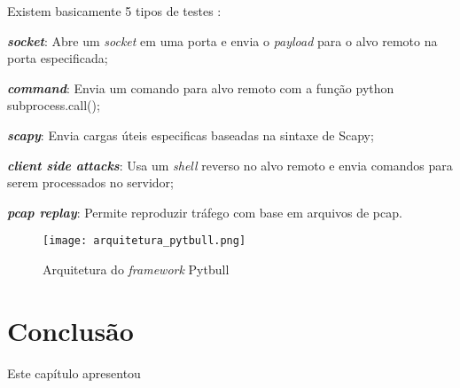 Existem basicamente 5 tipos de testes \cite{pytbull}: 
\begin{alineas}
\item \textbf{\textit{socket}}: Abre um \textit{socket} em uma porta e envia o \textit{payload} para o alvo remoto na porta especificada; 
\item \textbf{\textit{command}}: Envia um comando para alvo remoto com a função python subprocess.call(); 
\item \textbf{\textit{scapy}}: Envia cargas úteis especificas baseadas na sintaxe de Scapy;
\item \textbf{\textit{client side attacks}}: Usa um \textit{shell} reverso no alvo remoto e envia comandos para serem processados no servidor; 
\item \textbf{\textit{pcap replay}}: Permite reproduzir tráfego com base em arquivos de pcap.
\end{alineas}

 \begin{figure}[htb]
  \centering
  \caption{Arquitetura do \textit{framework} Pytbull}
  \texttt{[image: arquitetura\_pytbull.png]}
  \label{fig:pytbull}
 \end{figure}

 \section{Conclusão}

 Este capítulo apresentou
